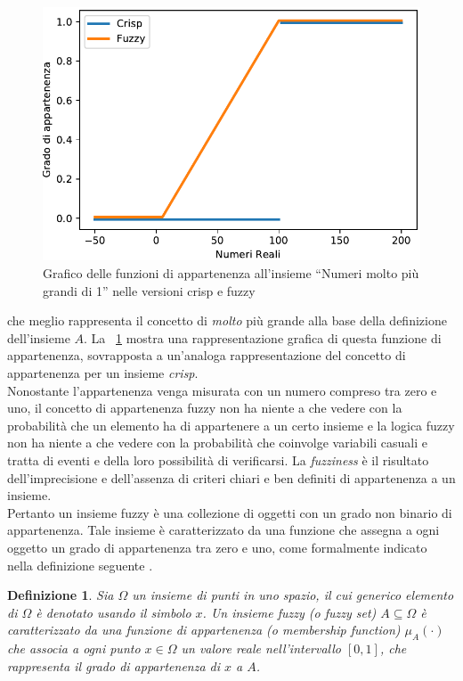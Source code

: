 \documentclass [11pt,a4paper,twoside,openright] {book}
\newtheorem{fuzzyset}{Definizione}
\begin{document}
\begin{figure}[!h]
\centering
\includegraphics[scale=0.6]{figure/fuzzycrisp.pdf}
\caption{Grafico delle funzioni di appartenenza all'insieme ``Numeri molto più grandi di 1'' nelle versioni crisp e fuzzy \label{fuzzycrisp}}
\end{figure}che meglio rappresenta il concetto di \textit{molto} più grande alla base della definizione dell'insieme $A$. La \figurename~\ref{fuzzycrisp} mostra una rappresentazione grafica di questa funzione di appartenenza, sovrapposta a un'analoga rappresentazione del concetto di appartenenza per un insieme \textit{crisp}.\\
Nonostante l'appartenenza venga misurata con un numero compreso tra zero e uno, il concetto di appartenenza fuzzy non ha niente a che vedere con la probabilità che un elemento ha di appartenere a un certo insieme e la logica fuzzy non ha niente a che vedere con la probabilità che coinvolge variabili casuali e tratta di eventi e della loro possibilità di verificarsi. La \textit{fuzziness} è il risultato dell'imprecisione e dell'assenza di criteri chiari e ben definiti di appartenenza a un insieme.\\
Pertanto un insieme fuzzy è una collezione di oggetti con un grado non binario di appartenenza. Tale insieme è caratterizzato da una funzione che assegna a ogni oggetto un grado di appartenenza tra zero e uno, come formalmente indicato nella definizione seguente  \cite{zadeh1965fuzzy}.
\begin{fuzzyset}
Sia $\Omega$ un insieme di punti in uno spazio, il cui generico elemento di $\Omega$ è denotato usando il simbolo $x$. Un \textit{insieme fuzzy} (o \textit{fuzzy set}) $A \subseteq \Omega$ è caratterizzato da una funzione di \textit{appartenenza} (o \textit{membership function}) $\mu_{A}(\cdot)$ che associa a ogni punto $x \in \Omega$ un valore reale nell'intervallo $[0,1]$, che rappresenta il \textit{grado di appartenenza} di $x$ a $A$.
\end{fuzzyset}
\end{document}
